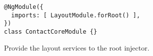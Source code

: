 \ifshowListings
  \begin{listing}[H]
  \begin{verbatim}
@NgModule({
  imports: [ LayoutModule.forRoot() ],
})
class ContactCoreModule {}
  \end{verbatim}
  \caption{Provide the layout services to the root injector.}\label{code:applied-methods:communication-patterns:importing-the-root-layout-module}
  \end{listing}
\fi
